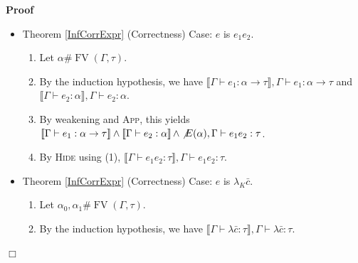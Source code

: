 \documentclass{article}
\newcommand{\colons}{\,:\,}
\newcommand{\tmname}[1]{\textsc{#1}}
\newcommand{\tmop}[1]{\ensuremath{\operatorname{#1}}}
\newcommand{\tmstrong}[1]{\textbf{#1}}
\newenvironment{proof}{\noindent\textbf{Proof\ }}{\hspace*{\fill}$\Box$\medskip}
\begin{document}
\begin{proof}
\begin{itemize}
\begin{enumerate}
      \item By (3) and {\tmname{DisjElim}} we get \ $\left( \llbracket \Gamma
      \vdash e_1 : \alpha_0 \rrbracket \wedge \llbracket \Gamma \vdash p.e_2 :
      \alpha_0 \rightarrow \tau \rrbracket \wedge \not{E} (\alpha_0) \right)
      \vee_{\mathcal{E}} (\llbracket \Gamma \vdash e_1 : \alpha_0 \rrbracket
      \wedge \llbracket \Gamma \vdash K p.e_2 : \alpha_0 \rightarrow \tau
      \rrbracket), \Gamma \vdash \text{{\tmstrong{let}}} p = e_1 
      \text{{\tmstrong{in}}} e_2 : {\nobreak} \tau$ for $\mathcal{E}= \{ K | K
      \colons \forall \overline{\alpha_K} \bar{\beta} [E] . \tau \rightarrow
      \varepsilon_K (\overline{\alpha_K}) \}$.
      
      \item By (4), weakening and {\tmname{Hide}}, we get the goal.
    \end{enumerate}
    \item Theorem \ref{InfCorrExpr} (Correctness) Case: $e$ is $e_1 e_2$.
    \begin{enumerate}
      \item Let $\alpha \# \tmop{FV} (\Gamma, \tau)$.
      
      \item By the induction hypothesis, we have $\llbracket \Gamma \vdash e_1
      : \alpha \rightarrow \tau \rrbracket, \Gamma \vdash e_1 : \alpha
      \rightarrow \tau$ and $\llbracket \Gamma \vdash e_2 : \alpha \rrbracket,
      \Gamma \vdash e_2 : \alpha$.
      
      \item By weakening and {\tmname{App}}, this yields $\llbracket \Gamma
      \vdash e_1 : \alpha \rightarrow \tau \rrbracket \wedge \left\llbracket
      \Gamma \vdash e_2 : {\nobreak} \alpha \right\rrbracket \wedge \not{E}
      (\alpha), \Gamma \vdash e_1 e_2 : {\nobreak} \tau$.
      
      \item By {\tmname{Hide}} using (1), $\llbracket \Gamma \vdash e_1 e_2 :
      \tau \rrbracket, \Gamma \vdash e_1 e_2 : \tau$.
    \end{enumerate}
    \item Theorem \ref{InfCorrExpr} (Correctness) Case: $e$ is $\lambda_K
    \bar{c}$.
    \begin{enumerate}
      \item Let $\alpha_0, \alpha_1 \# \tmop{FV} (\Gamma, \tau)$.
      
      \item By the induction hypothesis, we have $\llbracket \Gamma \vdash
      \lambda \bar{c} : \tau \rrbracket, \Gamma \vdash \lambda \bar{c} :
      \tau$.
      

\end{enumerate}
\end{itemize}
\end{proof}
\end{document}
